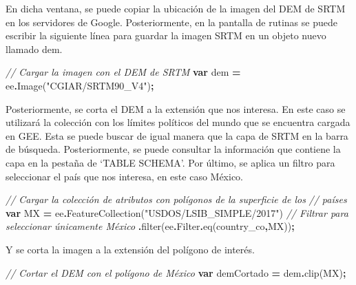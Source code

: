 \documentclass[
  12pt,
  letterpaper,
  twoside]{book}
\newenvironment{Shaded}{\begin{snugshade}}{\end{snugshade}}
\newcommand{\AttributeTok}[1]{\textcolor[rgb]{0.77,0.63,0.00}{#1}}
\newcommand{\CommentTok}[1]{\textcolor[rgb]{0.56,0.35,0.01}{\textit{#1}}}
\newcommand{\FunctionTok}[1]{\textcolor[rgb]{0.00,0.00,0.00}{#1}}
\newcommand{\KeywordTok}[1]{\textcolor[rgb]{0.13,0.29,0.53}{\textbf{#1}}}
\newcommand{\NormalTok}[1]{#1}
\newcommand{\OperatorTok}[1]{\textcolor[rgb]{0.81,0.36,0.00}{\textbf{#1}}}
\newcommand{\StringTok}[1]{\textcolor[rgb]{0.31,0.60,0.02}{#1}}
\begin{document}
En dicha ventana, se puede copiar la ubicación de la imagen del DEM de SRTM en los servidores de Google. Posteriormente, en la pantalla de rutinas se puede escribir la siguiente línea para guardar la imagen SRTM en un objeto nuevo llamado dem.

\begin{Shaded}
\begin{Highlighting}[]
\CommentTok{// Cargar la imagen con el DEM de SRTM}
\KeywordTok{var}\NormalTok{ dem }\OperatorTok{=}\NormalTok{ ee}\OperatorTok{.}\FunctionTok{Image}\NormalTok{(}\StringTok{"CGIAR/SRTM90\_V4"}\NormalTok{)}\OperatorTok{;}
\end{Highlighting}
\end{Shaded}

Posteriormente, se corta el DEM a la extensión que nos interesa. En este caso se utilizará la colección con los límites políticos del mundo que se encuentra cargada en GEE. Esta se puede buscar de igual manera que la capa de SRTM en la barra de búsqueda. Posteriormente, se puede consultar la información que contiene la capa en la pestaña de `TABLE SCHEMA'. Por último, se aplica un filtro para seleccionar el país que nos interesa, en este caso México.

\begin{Shaded}
\begin{Highlighting}[]
\CommentTok{// Cargar la colección de atributos con polígonos de la superficie de los }
\CommentTok{// países}
\KeywordTok{var}\NormalTok{ MX }\OperatorTok{=}\NormalTok{ ee}\OperatorTok{.}\FunctionTok{FeatureCollection}\NormalTok{(}\StringTok{"USDOS/LSIB\_SIMPLE/2017"}\NormalTok{)}
   \CommentTok{// Filtrar para seleccionar únicamente México}
  \OperatorTok{.}\FunctionTok{filter}\NormalTok{(ee}\OperatorTok{.}\AttributeTok{Filter}\OperatorTok{.}\FunctionTok{eq}\NormalTok{(}\StringTok{\textquotesingle{}country\_co\textquotesingle{}}\OperatorTok{,}\StringTok{\textquotesingle{}MX\textquotesingle{}}\NormalTok{))}\OperatorTok{;}
\end{Highlighting}
\end{Shaded}

Y se corta la imagen a la extensión del polígono de interés.

\begin{Shaded}
\begin{Highlighting}[]
\CommentTok{// Cortar el DEM con el polígono de México}
\KeywordTok{var}\NormalTok{ demCortado }\OperatorTok{=}\NormalTok{ dem}\OperatorTok{.}\FunctionTok{clip}\NormalTok{(MX)}\OperatorTok{;}
\end{Highlighting}
\end{Shaded}
\end{document}
